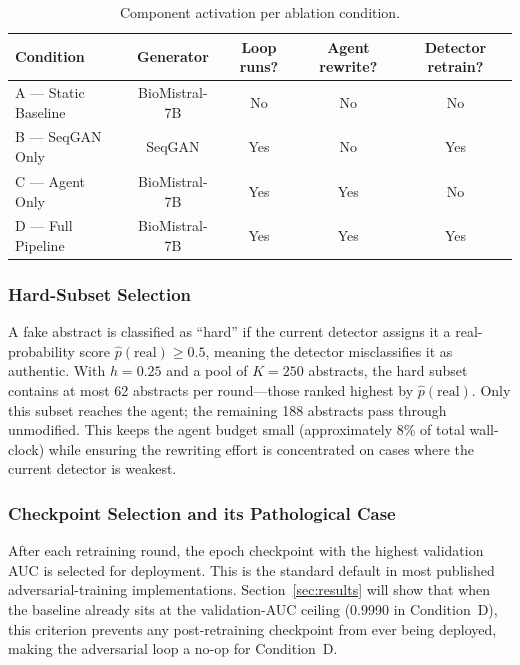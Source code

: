 \documentclass[12pt,a4paper]{article}
\begin{document}
\begin{table}[H]
\centering
\caption{Component activation per ablation condition.}
\label{tab:conditions}
\renewcommand{\arraystretch}{1.25}
\begin{tabular}{@{}lcccc@{}}
\toprule
\textbf{Condition} & \textbf{Generator} & \textbf{Loop runs?} &
\textbf{Agent rewrite?} & \textbf{Detector retrain?} \\
\midrule
A — Static Baseline  & BioMistral-7B & No  & No  & No  \\
B — SeqGAN Only      & SeqGAN        & Yes & No  & Yes \\
C — Agent Only       & BioMistral-7B & Yes & Yes & No  \\
D — Full Pipeline    & BioMistral-7B & Yes & Yes & Yes \\
\bottomrule
\end{tabular}
\end{table}

\subsubsection{Hard-Subset Selection}

A fake abstract is classified as ``hard'' if the current detector assigns
it a real-probability score $\hat{p}(\text{real}) \geq 0.5$, meaning the
detector misclassifies it as authentic. With $h = 0.25$ and a pool of
$K = 250$ abstracts, the hard subset contains at most 62 abstracts per
round—those ranked highest by $\hat{p}(\text{real})$. Only this subset
reaches the agent; the remaining 188 abstracts pass through unmodified.
This keeps the agent budget small (approximately 8\% of total wall-clock)
while ensuring the rewriting effort is concentrated on cases where the
current detector is weakest.

\subsubsection{Checkpoint Selection and its Pathological Case}

After each retraining round, the epoch checkpoint with the highest
validation AUC is selected for deployment. This is the standard default
in most published adversarial-training implementations. Section~\ref{sec:results}
will show that when the baseline already sits at the validation-AUC ceiling
(0.9990 in Condition~D), this criterion prevents any post-retraining
checkpoint from ever being deployed, making the adversarial loop a no-op
for Condition~D.
\end{document}

